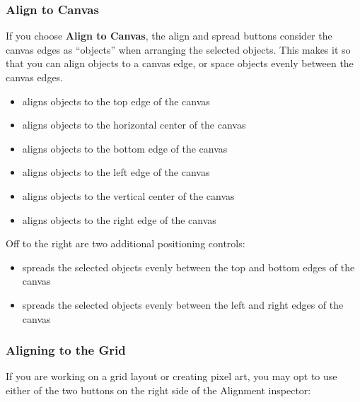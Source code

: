 \documentclass[../main.tex]{subfiles}
\begin{document}
\subsubsection{Align to Canvas}

If you choose \textbf{Align to Canvas}, the align and spread buttons consider the canvas edges
as ``objects'' when arranging the selected objects. This makes it so that you can align
objects to a canvas edge, or space objects evenly between the canvas edges.


\begin{itemize}
  \item {} aligns objects to the top edge of the
    canvas
  \item {} aligns objects to the horizontal
    center of the canvas
  \item {} aligns objects to the bottom edge of
    the canvas
  \item {} aligns objects to the left edge of the
    canvas
  \item {} aligns objects to the vertical center
    of the canvas
  \item {} aligns objects to the right edge of the
    canvas
\end{itemize}

Off to the right are two additional positioning controls:

\begin{itemize}
  \item {} spreads the selected objects evenly
    between the top and bottom edges of the canvas
  \item {} spreads the selected objects evenly
    between the left and right edges of the canvas
\end{itemize}

\subsubsection{Aligning to the Grid}

If you are working on a grid layout or creating pixel art, you may opt to use either of the two
buttons on the right side of the Alignment inspector:
\end{document}
